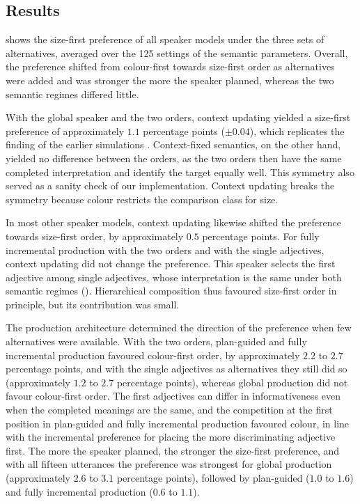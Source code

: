 \documentclass[10pt,a4paper,fleqn]{article}
\begin{document}
\subsection{Results}
\label{sec:simulation:conditions}
 shows the size-first preference of all speaker models under the three sets of alternatives, averaged over the 125 settings of the semantic parameters.
Overall, the preference shifted from colour-first towards size-first order as alternatives were added and was stronger the more the speaker planned, whereas the two semantic regimes differed little.

With the global speaker and the two orders, context updating yielded a size-first preference of approximately $1.1$ percentage points ($\pm0.04$), which replicates the finding of the earlier simulations \citep{franke2019subjectivity}.
Context-fixed semantics, on the other hand, yielded no difference between the orders, as the two orders then have the same completed interpretation and identify the target equally well.
This symmetry also served as a sanity check of our implementation.
Context updating breaks the symmetry because colour restricts the comparison class for size.

In most other speaker models, context updating likewise shifted the preference towards size-first order, by approximately $0.5$ percentage points.
For fully incremental production with the two orders and with the single adjectives, context updating did not change the preference.
This speaker selects the first adjective among single adjectives, whose interpretation is the same under both semantic regimes ().
Hierarchical composition thus favoured size-first order in principle, but its contribution was small.

The production architecture determined the direction of the preference when few alternatives were available.
With the two orders, plan-guided and fully incremental production favoured colour-first order, by approximately $2.2$ to $2.7$ percentage points, and with the single adjectives as alternatives they still did so (approximately $1.2$ to $2.7$ percentage points), whereas global production did not favour colour-first order.
The first adjectives can differ in informativeness even when the completed meanings are the same, and the competition at the first position in plan-guided and fully incremental production favoured colour, in line with the incremental preference for placing the more discriminating adjective first.
The more the speaker planned, the stronger the size-first preference, and with all fifteen utterances the preference was strongest for global production (approximately $2.6$ to $3.1$ percentage points), followed by plan-guided ($1.0$ to $1.6$) and fully incremental production ($0.6$ to $1.1$).
\end{document}
